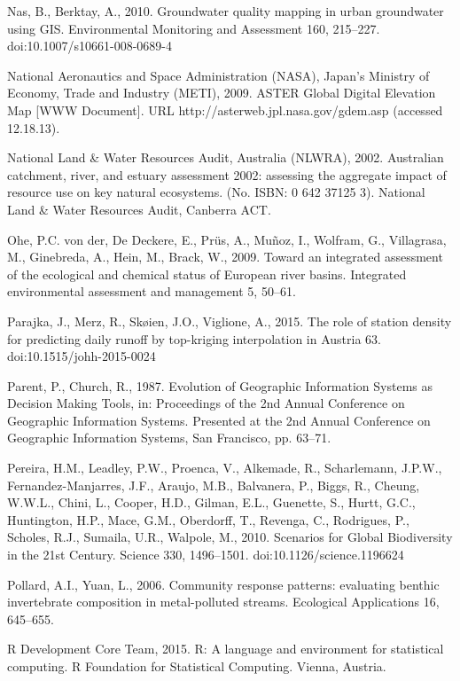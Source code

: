 \begin{thebibliography}
\bibitem{} \hangindent=1cm Nas, B., Berktay, A., 2010. Groundwater quality mapping in urban groundwater using GIS. Environmental Monitoring and Assessment 160, 215–227. doi:10.1007/s10661-008-0689-4

\bibitem{} \hangindent=1cm National Aeronautics and Space Administration (NASA), Japan’s Ministry of Economy, Trade and Industry (METI), 2009. ASTER Global Digital Elevation Map [WWW Document]. URL http://asterweb.jpl.nasa.gov/gdem.asp (accessed 12.18.13).

\bibitem{} \hangindent=1cm National Land & Water Resources Audit, Australia (NLWRA), 2002. Australian catchment, river, and estuary assessment 2002: assessing the aggregate impact of resource use on key natural ecosystems. (No. ISBN: 0 642 37125 3). National Land & Water Resources Audit, Canberra ACT.

\bibitem{} \hangindent=1cm Ohe, P.C. von der, De Deckere, E., Prü\s s, A., Muñoz, I., Wolfram, G., Villagrasa, M., Ginebreda, A., Hein, M., Brack, W., 2009. Toward an integrated assessment of the ecological and chemical status of European river basins. Integrated environmental assessment and management 5, 50–61.

\bibitem{} \hangindent=1cm Parajka, J., Merz, R., Skøien, J.O., Viglione, A., 2015. The role of station density for predicting daily runoff by top-kriging interpolation in Austria 63. doi:10.1515/johh-2015-0024

\bibitem{} \hangindent=1cm Parent, P., Church, R., 1987. Evolution of Geographic Information Systems as Decision Making Tools, in: Proceedings of the 2nd Annual Conference on Geographic Information Systems. Presented at the 2nd Annual Conference on Geographic Information Systems, San Francisco, pp. 63–71.

\bibitem{} \hangindent=1cm Pereira, H.M., Leadley, P.W., Proenca, V., Alkemade, R., Scharlemann, J.P.W., Fernandez-Manjarres, J.F., Araujo, M.B., Balvanera, P., Biggs, R., Cheung, W.W.L., Chini, L., Cooper, H.D., Gilman, E.L., Guenette, S., Hurtt, G.C., Huntington, H.P., Mace, G.M., Oberdorff, T., Revenga, C., Rodrigues, P., Scholes, R.J., Sumaila, U.R., Walpole, M., 2010. Scenarios for Global Biodiversity in the 21st Century. Science 330, 1496–1501. doi:10.1126/science.1196624

\bibitem{} \hangindent=1cm Pollard, A.I., Yuan, L., 2006. Community response patterns: evaluating benthic invertebrate composition in metal-polluted streams. Ecological Applications 16, 645–655.

\bibitem{} \hangindent=1cm R Development Core Team, 2015. R: A language and environment for statistical computing. R Foundation for Statistical Computing. Vienna, Austria.


\end{thebibliography}
